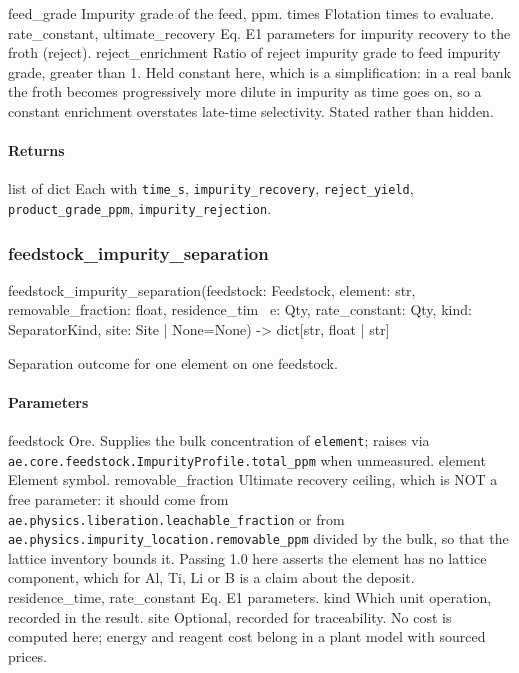 \documentclass[10pt,a4paper,twoside]{report}
\begin{document}
feed\_grade Impurity grade of the feed, ppm. times Flotation times to evaluate. rate\_constant, ultimate\_recovery Eq. E1 parameters for impurity recovery to the froth (reject). reject\_enrichment Ratio of reject impurity grade to feed impurity grade, greater than 1. Held constant here, which is a simplification: in a real bank the froth becomes progressively more dilute in impurity as time goes on, so a constant enrichment overstates late-time selectivity. Stated rather than hidden.

\paragraph*{Returns}

list of dict Each with \texttt{time\_s}, \texttt{impurity\_recovery}, \texttt{reject\_yield}, \texttt{product\_grade\_ppm}, \texttt{impurity\_rejection}.

\subsubsection*{feedstock\_impurity\_separation}

\begin{verbatimsmall}
feedstock_impurity_separation(feedstock: Feedstock, element: str, removable_fraction: float, residence_tim
    \ e: Qty, rate_constant: Qty, kind: SeparatorKind, site: Site | None=None) -> dict[str, float | str]
\end{verbatimsmall}

Separation outcome for one element on one feedstock.

\paragraph*{Parameters}

feedstock Ore. Supplies the bulk concentration of \texttt{element}; raises via \texttt{ae.core.feedstock.ImpurityProfile.total\_ppm} when unmeasured. element Element symbol. removable\_fraction Ultimate recovery ceiling, which is NOT a free parameter: it should come from \texttt{ae.physics.liberation.leachable\_fraction} or from \texttt{ae.physics.impurity\_location.removable\_ppm} divided by the bulk, so that the lattice inventory bounds it. Passing 1.0 here asserts the element has no lattice component, which for Al, Ti, Li or B is a claim about the deposit. residence\_time, rate\_constant Eq. E1 parameters. kind Which unit operation, recorded in the result. site Optional, recorded for traceability. No cost is computed here; energy and reagent cost belong in a plant model with sourced prices.
\end{document}
